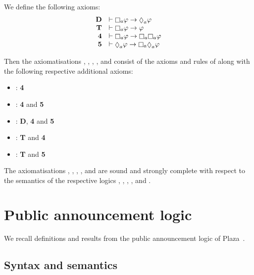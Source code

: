 \begin{definition}
We define the following axioms:
$$
\begin{array}{rl}
    {\bf D}     & \proves \necessary[\agentA] \phi \implies \possible[\agentA] \phi\\
    {\bf T}     & \proves \necessary[\agentA] \phi \implies \phi\\
    {\bf 4}     & \proves \necessary[\agentA] \phi \implies \necessary[\agentA] \necessary[\agentA] \phi\\
    {\bf 5}     & \proves \possible[\agentA] \phi \implies \necessary[\agentA] \possible[\agentA] \phi
\end{array}
$$

Then the axiomatisations \axiomKF{}, \axiomKFF{}, \axiomKD{}, \axiomSF{}, and \axiomS{} consist of the axioms and rules of \axiomK{} along with the following respective additional axioms:
\begin{itemize}
    \item \axiomKF{}: {\bf 4}
    \item \axiomKFF{}: {\bf 4} and {\bf 5}
    \item \axiomKD{}: {\bf D}, {\bf 4} and {\bf 5}
    \item \axiomSF{}: {\bf T} and {\bf 4}
    \item \axiomS{}: {\bf T} and {\bf 5}
\end{itemize}
\end{definition}

\begin{proposition}
The axiomatisations \axiomKF{}, \axiomKFF{}, \axiomKD{}, \axiomSF{}, and \axiomS{} are sound and strongly complete with respect to the semantics of the respective logics \logicKF{}, \logicKFF{}, \logicKD{}, \logicSF{}, and \logicS{}.
\end{proposition}

\section{Public announcement logic}

We recall definitions and results from the public announcement logic of Plaza~\cite{plaza:1989}.

\subsection{Syntax and semantics}

